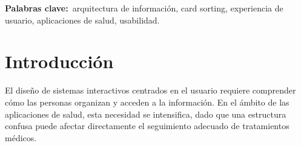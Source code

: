 \documentclass[11pt]{article}
\begin{document}
\vspace{4pt}

\begin{abstract}
El diseño de la arquitectura de información en aplicaciones de salud representa un desafío crítico, especialmente cuando se orienta a usuarios con responsabilidades de cuidado. Este trabajo presenta la aplicación de la técnica de card sorting mixto para definir la estructura de navegación de la aplicación Elderly Care, específicamente desde el rol del cuidador.

A partir de la participación de diez usuarios, se identificaron patrones consistentes en la organización de las funcionalidades, destacando la centralidad de los conceptos de pacientes, medicamentos y alertas. Los resultados evidencian además ambigüedades conceptuales en torno al seguimiento del tratamiento, lo que motivó la reorganización de dichas funciones.

Como resultado, se propone una arquitectura de información alineada con el modelo mental de los usuarios en su rol de cuidadores, con el objetivo de mejorar la usabilidad y facilitar la supervisión del tratamiento.
\end{abstract}

\noindent
\begin{mdframed}[backgroundcolor=softgray, linecolor=uniblue, linewidth=0.7pt,
    innertopmargin=5pt, innerbottommargin=5pt, innerleftmargin=8pt, innerrightmargin=8pt]
  \small\textbf{\color{uniblue}Palabras clave:}\ arquitectura de información, card sorting,
  experiencia de usuario, aplicaciones de salud, usabilidad.
\end{mdframed}

\vspace{6pt}
\vspace{1cm}
\noindent{\color{uniblue}\rule{\linewidth}{1pt}}
\vspace{0.2cm}
\newpage
\section{Introducción}

El diseño de sistemas interactivos centrados en el usuario requiere comprender cómo las personas
organizan y acceden a la información. En el ámbito de las aplicaciones de salud, esta necesidad
se intensifica, dado que una estructura confusa puede afectar directamente el seguimiento adecuado
de tratamientos médicos.
\end{document}
